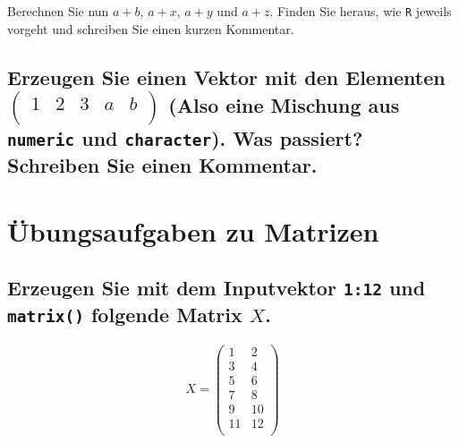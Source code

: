 \documentclass[12pt,a4paper]{article}
\begin{document}
Berechnen Sie nun \(a+b\), \(a+x\), \(a+y\) und \(a+z\). Finden Sie
heraus, wie \texttt{R} jeweils vorgeht und schreiben Sie einen kurzen
Kommentar.

\hypertarget{erzeugen-sie-einen-vektor-mit-den-elementen-beginpmatrix-1-2-3-a-b-endpmatrix-also-eine-mischung-aus-numeric-und-character.-was-passiert-schreiben-sie-einen-kommentar.}{%
\subsection{\texorpdfstring{Erzeugen Sie einen Vektor mit den Elementen
\(\begin{pmatrix} 1 & 2 & 3 & a & b \\ \end{pmatrix}\) (Also eine
Mischung aus \texttt{numeric} und \texttt{character}). Was passiert?
Schreiben Sie einen
Kommentar.}{Erzeugen Sie einen Vektor mit den Elementen \textbackslash begin\{pmatrix\} 1 \& 2 \& 3 \& a \& b \textbackslash\textbackslash{} \textbackslash end\{pmatrix\} (Also eine Mischung aus numeric und character). Was passiert? Schreiben Sie einen Kommentar.}}\label{erzeugen-sie-einen-vektor-mit-den-elementen-beginpmatrix-1-2-3-a-b-endpmatrix-also-eine-mischung-aus-numeric-und-character.-was-passiert-schreiben-sie-einen-kommentar.}}

\vspace{1cm}

\hypertarget{uxfcbungsaufgaben-zu-matrizen}{%
\section{Übungsaufgaben zu
Matrizen}\label{uxfcbungsaufgaben-zu-matrizen}}

\hypertarget{erzeugen-sie-mit-dem-inputvektor-112-und-folgende-matrix-x.}{%
\subsection{\texorpdfstring{Erzeugen Sie mit dem Inputvektor
\texttt{1:12} und \texttt{matrix()} folgende Matrix
\(X\).}{Erzeugen Sie mit dem Inputvektor 1:12 und  folgende Matrix X.}}\label{erzeugen-sie-mit-dem-inputvektor-112-und-folgende-matrix-x.}}

\[X = \begin{pmatrix} 1 & 2 \\ 3 & 4\\ 5 & 6 \\ 7 & 8 \\
9 & 10 \\ 11 & 12 \\\end{pmatrix}\]
\end{document}
